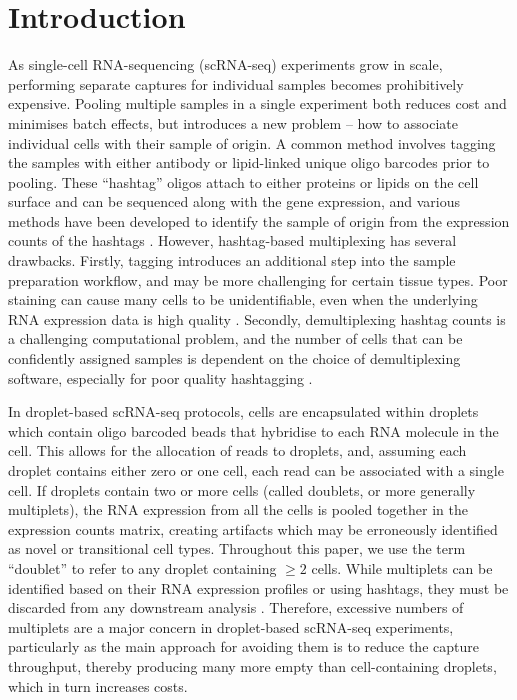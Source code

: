 \documentclass[unnumsec,webpdf,modern,large]{oup-authoring-template}
\begin{document}
		\maketitle
	
		\section{Introduction}
	\label{sec:introduction}
	
	As single-cell RNA-sequencing (scRNA-seq) experiments grow in scale, performing separate captures for individual samples becomes prohibitively expensive. 
	Pooling multiple samples in a single experiment both reduces cost and minimises batch effects, but introduces a new problem – how to associate individual cells with their sample of origin. 
	A common method involves tagging the samples with either antibody or lipid-linked unique oligo barcodes prior to pooling. 
	These ``hashtag'' oligos attach to either proteins or lipids on the cell surface and can be sequenced along with the gene expression, and various methods have been developed to identify the sample of origin from the expression counts of the hashtags 
	\citep{Howitt2023}.
	However, hashtag-based multiplexing has several drawbacks. 
	Firstly, tagging introduces an additional step into the sample preparation workflow, and may be more challenging for certain tissue types. 
	Poor staining can cause many cells to be unidentifiable, even when the underlying RNA expression data is high quality 
	\citep{Brown2024}. 
	Secondly, demultiplexing hashtag counts is a challenging computational problem, and the number of cells that can be confidently assigned samples is dependent on the choice of demultiplexing software, especially for poor quality hashtagging 
	\citep{Howitt2023}.
	
	In droplet-based scRNA-seq protocols, cells are encapsulated within droplets which contain oligo barcoded beads that hybridise to each RNA molecule in the cell. 
	This allows for the allocation of reads to droplets, and, assuming each droplet contains either zero or one cell, each read can be associated with a single cell. 
	If droplets contain two or more cells (called doublets, or more generally multiplets), the RNA expression from all the cells is pooled together in the expression counts matrix, creating artifacts which may be erroneously identified as novel or transitional cell types. 
	Throughout this paper, we use the term ``doublet'' to refer to any droplet containing $\geq 2$ cells.
	While multiplets can be identified based on their  RNA expression profiles or using hashtags, they must be discarded from any downstream analysis
	\citep{Neavin2024}.
	Therefore, excessive numbers of multiplets are a major concern in droplet-based scRNA-seq experiments, particularly as the main approach for  avoiding them is to reduce the capture throughput, thereby producing many more empty than cell-containing droplets, which in turn increases costs.
	
\end{document}
